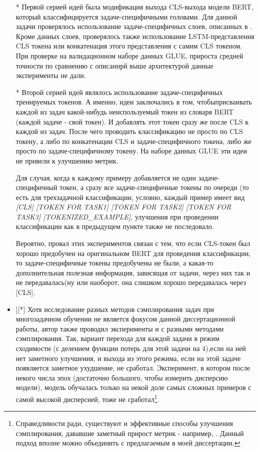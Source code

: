 \begin{itemize} 
 \item[*] Первой серией идей была модификация выхода CLS-выхода модели BERT, который классифицируется задаче-специфичными головами. Для данной задачи проверялось использование задаче-специфичных слоев, описанных в \cite{GhostBERT2021, TaskEmbedded2021, el-nouby2021xcit}. Кроме данных слоев, проверялось также использование LSTM-представления CLS токена или конкатенация этого представления с самим CLS токеном. При проверке на валидационном наборе данных GLUE, прироста средней точности по сравнению с описаннрй выше архитектурой данные эксперименты не дали. 
\item[*] Второй серией идей являлось использование задаче-специфичных тренируемых токенов. А именно, идеи заключались в том, чтобыприсваивать каждой из задач какой-нибудь неиспользуемый токен из словаря BERT (каждой задаче - свой токен). И добавлять этот токен сразу же после CLS к каждой из задач. После чего проводить классификацию не просто по CLS токену, а либо по конкатенации CLS и задаче-специфичного токена, либо же просто по задаче-специфичному токену. На наборе данных GLUE эти идеи не привели к улучшению метрик.

\ю Для случая, когда к каждому примеру добавляется не один задаче-специфичный токен, а сразу все задаче-специфичные токены по очереди (то есть для трехзадачной классификации, условно, каждый пример имеет вид \textit{[CLS] [TOKEN FOR TASK1] [TOKEN FOR TASK2] [TOKEN FOR TASK3] [TOKENIZED_EXAMPLE]}, улучшения при проведении классификации как в предыдущем пункте также не последовало. 

Вероятно, провал этих экспериментов связан с тем, что если CLS-токен был хорошо предобучен на оригинальном BERT для проведения классификации, то задаче-специфичные токены предобучены не были, а какая-то дополнительная полезная информация, зависящая от задачи, через них так и не передавалась(ну или наоборот, она слишком хорошо передавалась через [CLS]. 

\item][*] Хотя исследование разных методов сэмплирования задач при многозадачном обучении не является фокусом данной диссертационной работы, автор также проводил эксперименты и с разными методами сэмплирования. Так, вариант перехода для каждой задачи в режим сходимости (с делением функции потерь для этой задачи на 4),если на ней нет заметного улучшения, и выхода из этого режима, если на этой задаче появляется заметное ухудшение, не сработал. Эксперимент, в котором после некого числа эпох (достаточно большого, чтобы измерить дисперсию модели), модель обучалась только на некой доле самых сложных примеров с самой высокой дисперсией, тоже не сработал\footnote{Справедливости ради, существуют и эффективные способы улучшения сэмплирования, дававшие заметный прирост метрик - например, \cite{GradTS}. Данный подход вполне можно объединить с предлагаемым в моей диссертации.}. 


\end{itemize}
